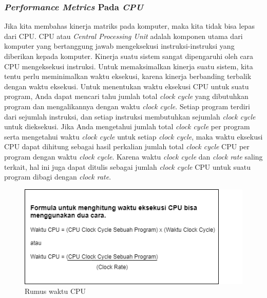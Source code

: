 \documentclass[12pt]{article}
\begin{document}
\subsubsection{\textit{Performance Metrics} Pada \textit{CPU}}
\hspace*{1cm} Jika kita membahas kinerja matriks pada komputer, maka kita tidak bisa lepas dari CPU. CPU atau \textit{Central Processing Unit} adalah komponen utama dari komputer yang bertanggung jawab mengeksekusi instruksi-instruksi yang diberikan kepada komputer. Kinerja suatu sistem sangat dipengaruhi oleh cara CPU mengeksekusi instruksi. Untuk memaksimalkan kinerja suatu sistem, kita tentu perlu meminimalkan waktu eksekusi, karena kinerja berbanding terbalik dengan waktu eksekusi.
\newline
\newline
\hspace*{1cm} Untuk menentukan waktu eksekusi CPU untuk suatu program, Anda dapat mencari tahu jumlah total \textit{\textit{clock} cycle} yang dibutuhkan program dan mengalikannya dengan waktu \textit{\textit{clock} cycle}. Setiap program terdiri dari sejumlah instruksi, dan setiap instruksi membutuhkan sejumlah \textit{\textit{clock} cycle} untuk dieksekusi. Jika Anda mengetahui jumlah total \textit{\textit{clock} cycle} per program serta mengetahui waktu \textit{\textit{clock} cycle} untuk setiap \textit{\textit{clock} cycle}, maka waktu eksekusi CPU dapat dihitung sebagai hasil perkalian jumlah total \textit{\textit{clock} cycle} CPU per program dengan waktu \textit{\textit{clock} cycle}. Karena waktu \textit{\textit{clock} cycle} dan \textit{\textit{clock} rate} saling terkait, hal ini juga dapat ditulis sebagai jumlah \textit{\textit{clock} cycle} CPU untuk suatu program dibagi dengan \textit{\textit{clock} rate}.

\begin{figure}
    \centering
    \includegraphics[width=\linewidth]{asset/image1.png}
    \caption{Rumus waktu CPU}
\end{figure}
\end{document}
